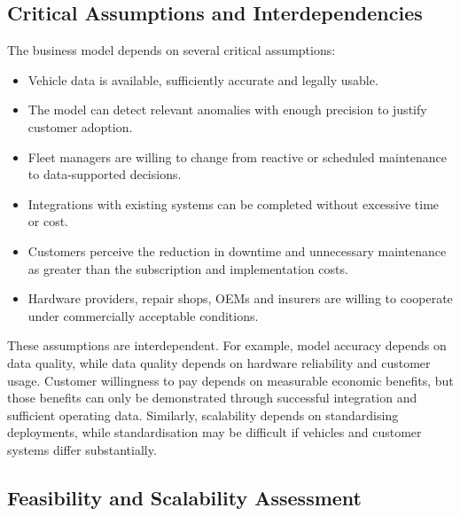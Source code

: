 \documentclass[11pt,a4paper]{article}
\begin{document}
\subsection{Critical Assumptions and Interdependencies}

The business model depends on several critical assumptions:
\begin{itemize}
    \item Vehicle data is available, sufficiently accurate and legally usable.
    \item The model can detect relevant anomalies with enough precision to justify customer adoption.
    \item Fleet managers are willing to change from reactive or scheduled maintenance to data-supported decisions.
    \item Integrations with existing systems can be completed without excessive time or cost.
    \item Customers perceive the reduction in downtime and unnecessary maintenance as greater than the subscription and implementation costs.
    \item Hardware providers, repair shops, OEMs and insurers are willing to cooperate under commercially acceptable conditions.
\end{itemize}

\noindent These assumptions are interdependent. For example, model accuracy depends on data quality, while data quality depends on hardware reliability and customer usage. Customer willingness to pay depends on measurable economic benefits, but those benefits can only be demonstrated through successful integration and sufficient operating data. Similarly, scalability depends on standardising deployments, while standardisation may be difficult if vehicles and customer systems differ substantially.

\subsection{Feasibility and Scalability Assessment}
\end{document}
